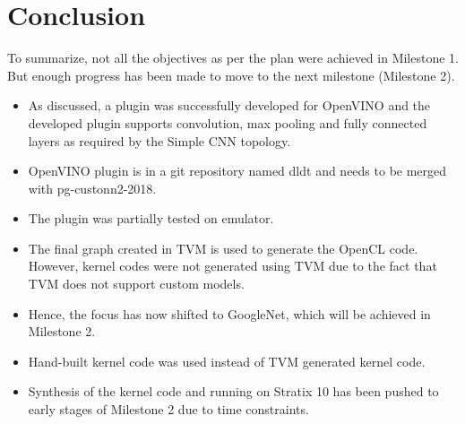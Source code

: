 \documentclass[titlepage]{report}
\begin{document}
\chapter{Conclusion}
To summarize, not all the objectives as per the plan were achieved in Milestone 1. But enough progress has been made to move to the next milestone (Milestone 2).
\begin{itemize}
\item As discussed, a plugin was successfully developed for OpenVINO and the developed plugin supports convolution, max pooling and fully connected layers as required by the Simple CNN topology.
\item OpenVINO plugin is in a git repository named dldt and needs to be merged with pg-custonn2-2018.

\item The plugin was partially tested on emulator.

\item The final graph created in TVM is used to generate the OpenCL code.
 However, kernel codes were not generated using TVM due to the fact that TVM does not support custom models.
 
 \item Hence, the focus has now shifted to GoogleNet, which will be achieved in Milestone 2.

 
 \item Hand-built kernel code was used instead of TVM generated kernel code.
 
 \item Synthesis of the kernel code and running on Stratix 10 has been pushed to early stages of Milestone 2 due to time constraints.
 



   
\end{itemize}
\end{document}

